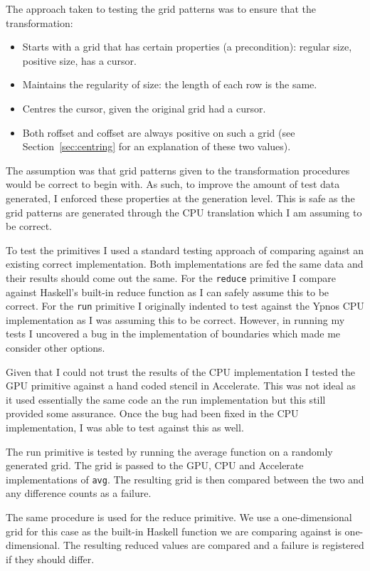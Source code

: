 \documentclass[12pt,a4paper,twoside]{scrbook}
\begin{document}
The approach taken to testing the grid patterns was to ensure that the
transformation:

\begin{itemize}
\item
  Starts with a grid that has certain properties (a precondition):
  regular size, positive size, has a cursor.
\item
  Maintains the regularity of size: the length of each row is the same.
\item
  Centres the cursor, given the original grid had a cursor.
\item
  Both roffset and coffset are always positive on such a grid (see
  Section~\ref{sec:centring} for an explanation of these two values).
\end{itemize}

The assumption was that grid patterns given to the transformation procedures
would be correct to begin with. As such, to improve the amount of test data
generated, I enforced these properties at the generation level. This is safe as
the grid patterns are generated through the CPU translation which I am assuming
to be correct.

To test the primitives I used a standard testing approach of comparing against
an existing correct implementation. Both implementations are fed the same data
and their results should come out the same. For the \texttt{reduce} primitive I
compare against Haskell's built-in reduce function as I can safely assume this
to be correct. For the \texttt{run} primitive I originally indented to test
against the Ypnos CPU implementation as I was assuming this to be
correct. However, in running my tests I uncovered a bug in the implementation of
boundaries which made me consider other options.

Given that I could not trust the results of the CPU implementation I tested the
GPU primitive against a hand coded stencil in Accelerate.  This was not ideal as
it used essentially the same code an the run implementation but this still
provided some assurance. Once the bug had been fixed in the CPU implementation,
I was able to test against this as well.

The run primitive is tested by running the average function on a randomly
generated grid. The grid is passed to the GPU, CPU and Accelerate
implementations of \texttt{avg}. The resulting grid is then compared between the
two and any difference counts as a failure.

The same procedure is used for the reduce primitive. We use a one-dimensional
grid for this case as the built-in Haskell function we are comparing against is
one-dimensional. The resulting reduced values are compared and a failure is
registered if they should differ.
\end{document}
